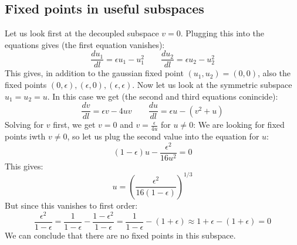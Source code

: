 \documentclass{article}
\begin{document}
\subsection{Fixed points in useful subspaces}
Let us look first at the decoupled subspace $v = 0$. Plugging this into the equations gives (the first equation vanishes):
\begin{equation}
    \frac{du_1}{dl} = \epsilon u_1 - u_1^2
    \qquad
    \frac{du_2}{dl} = \epsilon u_2 - u_2^2
\end{equation}
This gives, in addition to the gaussian fixed point $(u_1, u_2) = (0,0)$, also the fixed points $(0,\epsilon), (\epsilon, 0), (\epsilon,\epsilon)$.
\newline
Now let us look at the symmetric subspace $u_1 = u_2 = u$. In this case we get (the second and third equations conincide):
\begin{equation}
    \frac{dv}{dl} = \epsilon v - 4uv
    \qquad
    \frac{du}{dl} = \epsilon u - (v^2 + u)
\end{equation}
Solving for $v$ first, we get $v = 0$ and $v = \frac{\epsilon}{4u}$ for $u \ne 0$:
We are looking for fixed points iwth $v \ne 0$, so let us plug the second value into the equation for $u$:
\begin{equation}
    (1-\epsilon)u - \frac{\epsilon^2}{16u^2} = 0
\end{equation}
This gives:
\begin{equation}
    u = \left(\frac{\epsilon^2}{16(1-\epsilon)}\right)^{1/3}
\end{equation}
But since this vanishes to first order:
\begin{equation}
    \frac{\epsilon^2}{1-\epsilon} = 
    \frac{1}{1-\epsilon} - \frac{1 - \epsilon^2}{1-\epsilon} = 
    \frac{1}{1-\epsilon} - (1 + \epsilon) \approx
    1 + \epsilon - (1 + \epsilon) = 0 
\end{equation}
We can conclude that there are no fixed points in this subspace.
\end{document}
